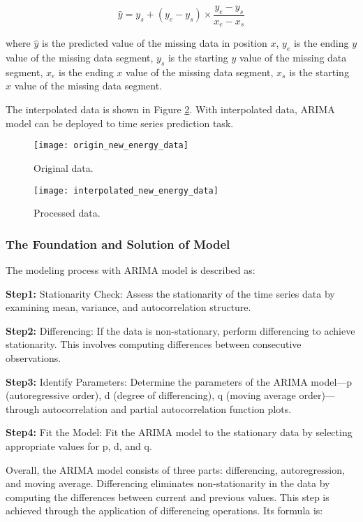 \documentclass{apmcmthesis}
\begin{document}
\begin{equation}
	\hat{y} = y_s + (y_e - y_s) \times \frac{y_e - y_s}{x_e - x_s}
\end{equation}

where $\hat{y}$ is the predicted value of the missing data in position $x$, $y_e$ is the ending $y$ value of the missing data segment, $y_s$ is the starting $y$ value of the missing data segment, $x_e$ is the ending $x$ value of the missing data segment, $x_s$ is the starting $x$ value of the missing data segment.

The interpolated data is shown in Figure \ref{figure 2}. With interpolated data, ARIMA model can be deployed to time series prediction task.

\begin{figure}[htbp]
	\centering
	\texttt{[image: origin\_new\_energy\_data]}
	\caption{Original data.}
	\label{figure 1}
\end{figure}

\begin{figure}[htbp]
	\centering
	\texttt{[image: interpolated\_new\_energy\_data]}
	\caption{Processed data.}
	\label{figure 2}
\end{figure}


\subsubsection{The Foundation and Solution of Model}

The modeling process with ARIMA model is described as:

\textbf{Step1:} Stationarity Check: Assess the stationarity of the time series data by examining mean, variance, and autocorrelation structure.

\textbf{Step2:} Differencing: If the data is non-stationary, perform differencing to achieve stationarity. This involves computing differences between consecutive observations.

\textbf{Step3:} Identify Parameters: Determine the parameters of the ARIMA model—p (autoregressive order), d (degree of differencing), q (moving average order)—through autocorrelation and partial autocorrelation function plots.

\textbf{Step4:} Fit the Model: Fit the ARIMA model to the stationary data by selecting appropriate values for p, d, and q.

Overall, the ARIMA model consists of three parts: differencing, autoregression, and moving average. Differencing eliminates non-stationarity in the data by computing the differences between current and previous values. This step is achieved through the application of differencing operations. Its formula is:
\end{document}
